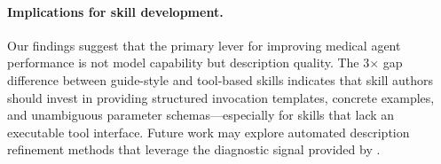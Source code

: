 \paragraph{Implications for skill development.}
Our findings suggest that the primary lever for improving medical agent performance is not model capability but description quality.
The 3$\times$ gap difference between guide-style and tool-based skills indicates that skill authors should invest in providing structured invocation templates, concrete examples, and unambiguous parameter schemas---especially for skills that lack an executable tool interface.
Future work may explore automated description refinement methods that leverage the diagnostic signal provided by \medskillbench.
